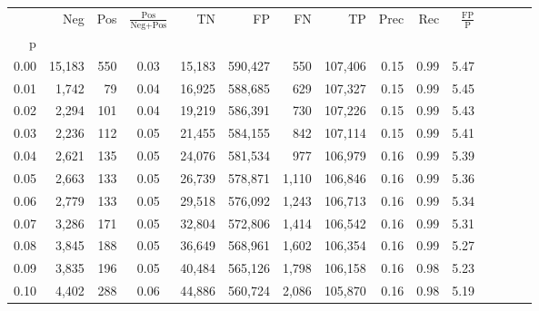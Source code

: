 \begin{tabular}{rrrcrrrrrrrrrrr}
\toprule
{} &     Neg &    Pos & $\frac{\text{Pos}}{\text{Neg}+\text{Pos}}$ &       TN &       FP &       FN &       TP &  Prec &   Rec & $\frac{\text{FP}}{\text{P}}$ \\
p    &         &        &                                            &          &          &          &          &       &       &                              \\
\midrule
0.00 &  15,183 &    550 &                                       0.03 &   15,183 &  590,427 &      550 &  107,406 &  0.15 &  0.99 &                         5.47 \\
0.01 &   1,742 &     79 &                                       0.04 &   16,925 &  588,685 &      629 &  107,327 &  0.15 &  0.99 &                         5.45 \\
0.02 &   2,294 &    101 &                                       0.04 &   19,219 &  586,391 &      730 &  107,226 &  0.15 &  0.99 &                         5.43 \\
0.03 &   2,236 &    112 &                                       0.05 &   21,455 &  584,155 &      842 &  107,114 &  0.15 &  0.99 &                         5.41 \\
0.04 &   2,621 &    135 &                                       0.05 &   24,076 &  581,534 &      977 &  106,979 &  0.16 &  0.99 &                         5.39 \\
0.05 &   2,663 &    133 &                                       0.05 &   26,739 &  578,871 &    1,110 &  106,846 &  0.16 &  0.99 &                         5.36 \\
0.06 &   2,779 &    133 &                                       0.05 &   29,518 &  576,092 &    1,243 &  106,713 &  0.16 &  0.99 &                         5.34 \\
0.07 &   3,286 &    171 &                                       0.05 &   32,804 &  572,806 &    1,414 &  106,542 &  0.16 &  0.99 &                         5.31 \\
0.08 &   3,845 &    188 &                                       0.05 &   36,649 &  568,961 &    1,602 &  106,354 &  0.16 &  0.99 &                         5.27 \\
0.09 &   3,835 &    196 &                                       0.05 &   40,484 &  565,126 &    1,798 &  106,158 &  0.16 &  0.98 &                         5.23 \\
0.10 &   4,402 &    288 &                                       0.06 &   44,886 &  560,724 &    2,086 &  105,870 &  0.16 &  0.98 &                         5.19 \\

\end{tabular}
